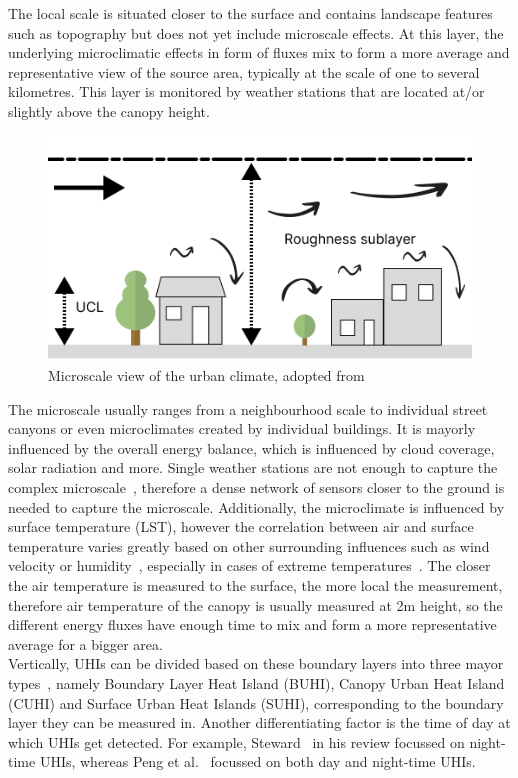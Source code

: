 The local scale is situated closer to the surface and contains landscape features such as topography but does not yet include microscale effects. At this layer, the underlying microclimatic effects in form of fluxes mix to form a more average and representative view of the source area, typically at the scale of one to several kilometres. This layer is monitored by weather stations that are located at/or slightly above the canopy height.

\begin{figure}[h]
    \centering
    \includegraphics[width=\textwidth]{images/microscale boundary layer.png}
    \caption{Microscale view of the urban climate, adopted from~\cite{oke2006guideline}}
    \label{fig:microscale boundary layer}
\end{figure}

The microscale usually ranges from a neighbourhood scale to individual street canyons or even microclimates created by individual buildings. It is mayorly influenced by the overall energy balance, which is influenced by cloud coverage, solar radiation and more. Single weather stations are not enough to capture the complex microscale~\cite{oke2004siting}, therefore a dense network of sensors closer to the ground is needed to capture the microscale. Additionally, the microclimate is influenced by surface temperature (LST), however the correlation between air and surface temperature varies greatly based on other surrounding influences such as wind velocity or humidity~\cite{stoll1992surface}, especially in cases of extreme temperatures~\cite{good2016situ}. The closer the air temperature is measured to the surface, the more local the measurement, therefore air temperature of the canopy is usually measured at 2m height, so the different energy fluxes have enough time to mix and form a more representative average for a bigger area.\\
Vertically, UHIs can be divided based on these boundary layers into three mayor types~\cite{oke1976distinction, oke2017urban}, namely Boundary Layer Heat Island (BUHI), Canopy Urban Heat Island (CUHI) and Surface Urban Heat Islands (SUHI), corresponding to the boundary layer they can be measured in. Another differentiating factor is the time of day at which UHIs get detected. For example, Steward~\cite{stewart2011systematic} in his review focussed on night-time UHIs, whereas Peng et al.~\cite{peng2012surface} focussed on both day and night-time UHIs.

